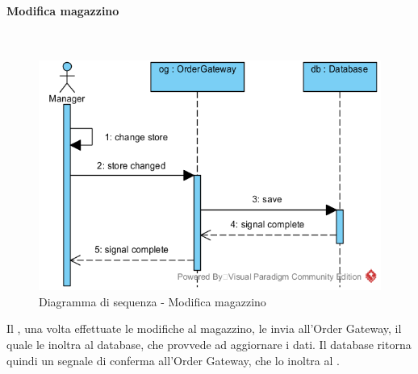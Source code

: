\begin{samepage}
\paragraph{Modifica magazzino}\mbox{}\\
\end{samepage}
\begin{figure}[H]
	\centering
	\includegraphics[width=15cm]{../../documenti/SpecificaTecnica/diagrammi_img/sequenza/direttore_modifica_magazzino.png}
	\caption{Diagramma di sequenza - Modifica magazzino}
\end{figure}
Il \Manager{}, una volta effettuate le modifiche al magazzino, le invia all'Order Gateway, il quale le inoltra al database, che provvede ad aggiornare i dati. Il database ritorna quindi un segnale di conferma all'Order Gateway, che lo inoltra al \Manager{}.

